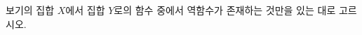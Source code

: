 \hspace*{2mm}\begin{minipage}[t]{\dimexpr\linewidth-2mm\relax}\vspace{0pt}
보기의 집합 $X$에서 집합 $Y$로의 함수 중에서 역함수가 존재하는 것만을 있는 대로 고르시오.
\par\smallskip\begin{center}\resizebox{\ifdim\width>\linewidth\linewidth\else\width\fi}{!}{}\end{center}\end{minipage}
